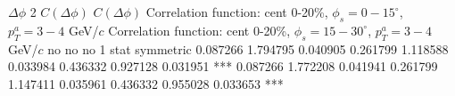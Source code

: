 $\Delta\phi$
2
$C(\Delta\phi)$
$C(\Delta\phi)$
Correlation function: cent 0-20\%, $\phi_{s} = 0-15^{\circ}$, $p^{a}_{T} = 3-4$ GeV/$c$
Correlation function: cent 0-20\%, $\phi_{s} = 15-30^{\circ}$, $p^{a}_{T} = 3-4$ GeV/$c$
no
no
no
1
stat
symmetric
0.087266  1.794795  0.040905  
0.261799  1.118588  0.033984  
0.436332  0.927128  0.031951  
***
0.087266  1.772208  0.041941  
0.261799  1.147411  0.035961  
0.436332  0.955028  0.033653  
***